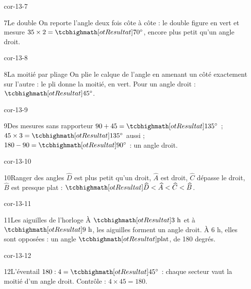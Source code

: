 \begin{blocLivre}{cor-13-7}\begin{corrige}{7}{Le double}
On reporte l’angle deux fois côte à côte : le double figure en vert et mesure $35\times2=\res{70^\circ}$, encore plus petit qu’un angle droit.
\label{fig-cor-13-7}
\end{corrige}\end{blocLivre}
\begin{blocLivre}{cor-13-8}\begin{corrige}{8}{La moitié par pliage}
On plie le calque de l’angle en amenant un côté exactement sur l’autre : le pli donne la moitié, en vert. Pour un angle droit : $\res{45^\circ}$.
\label{fig-cor-13-8}
\end{corrige}\end{blocLivre}
\begin{blocLivre}{cor-13-9}\begin{corrige}{9}{Des mesures sans rapporteur}
$90+45=\res{135^\circ}$ ; $45\times3=\res{135^\circ}$ aussi ; $180-90=\res{90^\circ}$ : un angle droit.
\end{corrige}\end{blocLivre}
\begin{blocLivre}{cor-13-10}\begin{corrige}{10}{Ranger des angles}
$\widehat D$ est plus petit qu’un droit, $\widehat A$ est droit, $\widehat C$ dépasse le droit, $\widehat B$ est presque plat : $\res{\widehat D<\widehat A<\widehat C<\widehat B}$.
\label{fig-cor-13-10}
\end{corrige}\end{blocLivre}
\begin{blocLivre}{cor-13-11}\begin{corrige}{11}{Les aiguilles de l’horloge}
À $\res{3\ \text h}$ et à $\res{9\ \text h}$, les aiguilles forment un angle droit. À 6 h, elles sont opposées : un angle $\res{\text{plat}}$, de 180 degrés.
\label{fig-cor-13-11}
\end{corrige}\end{blocLivre}
\begin{blocLivre}{cor-13-12}\begin{corrige}{12}{L’éventail}
$180:4=\res{45^\circ}$ : chaque secteur vaut la moitié d’un angle droit. Contrôle : $4\times45=180$.
\label{fig-cor-13-12}
\end{corrige}\end{blocLivre}
